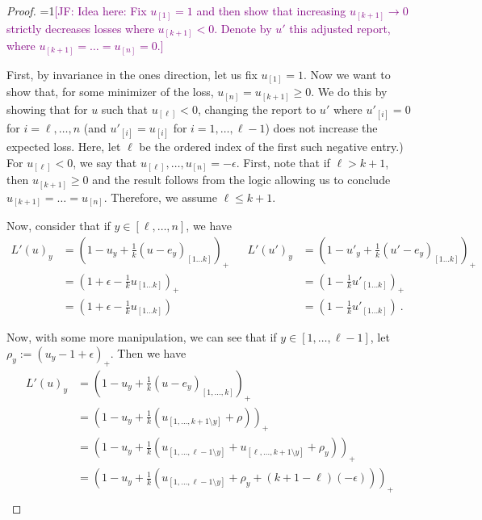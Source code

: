 \documentclass[12pt]{article}
\newcommand{\Comments}{1}
\newcommand{\mynote}[2]{\ifnum\Comments=1\textcolor{#1}{#2}\fi}
\newcommand{\jessie}[1]{\mynote{purple}{[JF: #1]}}
\begin{document}
\begin{proof}
  \jessie{Idea here: Fix $u_{[1]} = 1$ and then show that increasing $u_{[k+1]} \to 0$ strictly decreases losses where $u_{[k+1]} < 0$.  Denote by $u'$ this adjusted report, where $u_{[k+1]} = \ldots = u_{[n]} = 0$.}
  
  First, by invariance in the ones direction, let us fix $u_{[1]} = 1$.
  Now we want to show that, for some minimizer of the loss, $u_{[n]} = u_{[k+1]} \geq 0$.
  We do this by showing that for $u$ such that $u_{[\ell]} < 0$, changing the report to $u'$ where $u'_{[i]} = 0$ for $i = \ell, \ldots, n$ (and $u'_{[i]} = u_{[i]}$ for $i = 1, \ldots, \ell-1$) does not increase the expected loss. 
  Here, let $\ell$ be the ordered index of the first such negative entry.)
  For $u_{[\ell]} < 0$, we say that $u_{[\ell]}, \ldots, u_{[n]} = -\epsilon$.
  First, note that if $\ell > k+1$, then $u_{[k+1]} \geq 0$ and the result follows from the logic allowing us to conclude $u_{[k+1]} = \ldots = u_{[n]}$.
  Therefore, we assume $\ell \leq k+1$.
  
  Now, consider that if $y \in [\ell, \ldots, n]$, we have
  \begin{align*}
  L'(u)_y &= \left(1 - u_y + \frac{1}{k} (u-e_y)_{[1\ldots k]}\right)_+ &&   L'(u')_y &= \left(1 - u'_y + \frac{1}{k} (u'-e_y)_{[1\ldots k]}\right)_+\\
  &= \left(1 + \epsilon - \frac{1}{k} u_{[1 \ldots k]}\right)_+ &&   &= \left(1 - \frac{1}{k} u'_{[1 \ldots k]}\right)_+\\
  &= \left(1 + \epsilon - \frac{1}{k} u_{[1 \ldots k]}\right) &&   &= \left(1 - \frac{1}{k} u'_{[1 \ldots k]}\right)~.~
  \end{align*}
  
  Now, with some more manipulation, we can see that if $y \in [1, \ldots, \ell - 1]$, let $\rho_y := (u_y - 1 + \epsilon)_+$.
  Then we have
  \begin{align*}
  L'(u)_y &= \left(1 - u_y + \frac{1}{k} (u-e_y)_{[1,\ldots,k]}\right)_+ \\
  &= \left(1 - u_y + \frac{1}{k} (u_{[1,\ldots,k+1 \setminus y]} + \rho) \right)_+ \\
  &= \left(1 - u_y + \frac{1}{k} (u_{[1,\ldots,\ell-1 \setminus y]} + u_{[\ell,\ldots,k+1 \setminus y]} + \rho_y) \right)_+ \\
  &= \left(1 - u_y + \frac{1}{k} (u_{[1,\ldots,\ell-1 \setminus y]} + \rho_y + (k +1 - \ell)(-\epsilon)) \right)_+ \\
  \end{align*}
  

\end{proof}
\end{document}
